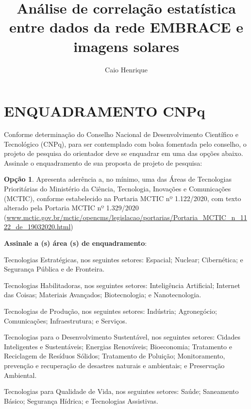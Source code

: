 \documentclass[12pt, consuni, professor]{uftpibic}
\title{Análise de correlação estatística entre dados da rede EMBRACE e imagens solares}
\author{Caio Henrique}{Machado}
\newcommand{\ok}{\makebox[0pt][l]{(\ \ \ )}\raisebox{.15ex}{\hspace{0.1em}\color{blue}{ $\checkmark\quad$}}}
\newcommand{\ko}{\makebox[0pt][l]{(\ \ \ )}\raisebox{.15ex}{\hspace{0.1em}$\qquad$}}
\theoremstyle{plain}
\begin{document}
\maketitle

\vspace{1cm}
\chapter{ENQUADRAMENTO CNP\lowercase{q}}

\onehalfspace
Conforme determinação do Conselho Nacional de Desenvolvimento Científico e Tecnológico (CNPq), para ser contemplado com bolsa fomentada pelo conselho, o projeto de pesquisa do orientador deve se enquadrar em uma das opções abaixo. Assinale o enquadramento de sua proposta de projeto de pesquisa:

\bigbreak

\ok \textbf{Opção 1}. Apresenta aderência a, no mínimo, uma das Áreas de Tecnologias Prioritárias do Ministério da Ciência, Tecnologia, Inovações e Comunicações (MCTIC), conforme estabelecido na Portaria MCTIC nº 1.122/2020, com texto alterado pela Portaria MCTIC nº 1.329/2020 (\url{www.mctic.gov.br/mctic/opencms/legislacao/portarias/Portaria_MCTIC_n_1122_de_19032020.html})

\bigbreak

\textbf{Assinale a (s) área (s) de enquadramento}:

\bigbreak

\ok  Tecnologias Estratégicas, nos seguintes setores: Espacial; Nuclear; Cibernética; e Segurança Pública e de Fronteira.

\ok Tecnologias Habilitadoras, nos seguintes setores: Inteligência Artificial; Internet das Coisas; Materiais Avançados; Biotecnologia; e Nanotecnologia.

\ko Tecnologias de Produção, nos seguintes setores: Indústria; Agronegócio; Comunicações; Infraestrutura; e Serviços.

\ko Tecnologias para o Desenvolvimento Sustentável, nos seguintes setores: Cidades Inteligentes e Sustentáveis; Energias Renováveis; Bioeconomia; Tratamento e Reciclagem de Resíduos Sólidos; Tratamento de Poluição; Monitoramento, prevenção e recuperação de desastres naturais e ambientais; e Preservação Ambiental.

\ko Tecnologias para Qualidade de Vida, nos seguintes setores: Saúde; Saneamento Básico; Segurança Hídrica; e Tecnologias Assistivas.

\bigbreak
\end{document}
